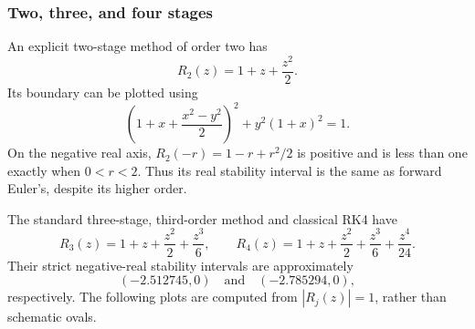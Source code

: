 \subsubsection{Two, three, and four stages}

An explicit two-stage method of order two has
\[
 R_2(z)=1+z+\frac{z^2}{2}.
\]
Its boundary can be plotted using
\[
 \left(1+x+\frac{x^2-y^2}{2}\right)^2+y^2(1+x)^2=1.
\]
On the negative real axis, \(R_2(-r)=1-r+r^2/2\) is positive and is
less than one exactly when \(0<r<2\). Thus its real stability interval
is the same as forward Euler's, despite its higher order.

The standard three-stage, third-order method and classical RK4 have
\[
 R_3(z)=1+z+\frac{z^2}{2}+\frac{z^3}{6},
 \qquad
 R_4(z)=1+z+\frac{z^2}{2}+\frac{z^3}{6}+\frac{z^4}{24}.
\]
Their strict negative-real stability intervals are approximately
\[
 (-2.512745,0)\quad\text{and}\quad(-2.785294,0),
\]
respectively. The following
plots are computed from \(|R_j(z)|=1\), rather than schematic ovals.

